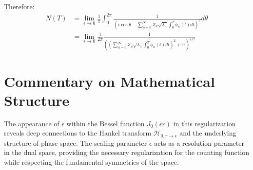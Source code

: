 \documentclass{article}
\begin{document}
Therefore:
\begin{equation}
\begin{split}
    N(T) &= \lim_{\epsilon \to 0} \frac{1}{\pi} \int_0^{2\pi} \frac{1}{(\epsilon\cos\theta - \sum_{n=0}^{\infty} Z_n \sqrt{\lambda_n} \int_0^T \phi_n(t) dt)^2} d\theta \\
    &= \lim_{\epsilon \to 0} \frac{1}{2\pi} \frac{1}{((\sum_{n=0}^{\infty} Z_n \sqrt{\lambda_n} \int_0^T \phi_n(t) dt)^2 + \epsilon^2)^{3/2}}
\end{split}
\end{equation}

\section*{Commentary on Mathematical Structure}
The appearance of $\epsilon$ within the Bessel function $J_0(\epsilon r)$ in this regularization reveals deep connections to the Hankel transform $\mathcal{H}_{0,r\to\epsilon}$ and the underlying structure of phase space. The scaling parameter $\epsilon$ acts as a resolution parameter in the dual space, providing the necessary regularization for the counting function while respecting the fundamental symmetries of the space.
\end{document}
